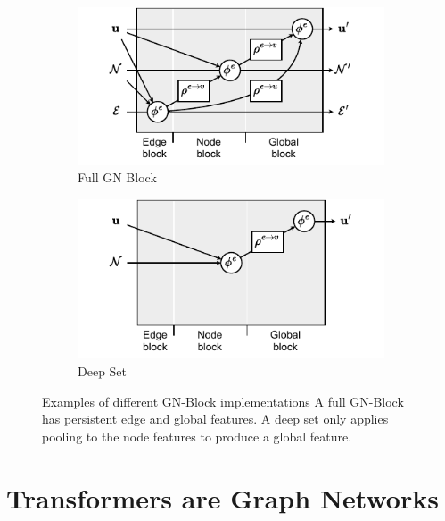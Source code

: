 \begin{figure}
    \centering
    \begin{subfigure}[b]{0.49\textwidth}
        \centering
        \includegraphics[width=\textwidth]{Figures/transformers/full_gn.pdf}
        \caption{Full GN Block}
        \label{fig:full_gn_block}
    \end{subfigure}
    \begin{subfigure}[b]{0.49\textwidth}
        \centering
        \includegraphics[width=\textwidth]{Figures/transformers/deepset.pdf}
        \caption{Deep Set}
        \label{fig:deep_set}
    \end{subfigure}
    \caption{Examples of different GN-Block implementations  A full GN-Block has persistent edge and global features.  A deep set only applies pooling to the node features to produce a global feature.}
\end{figure}

\section{Transformers are Graph Networks}
\label{sec:transformers}

